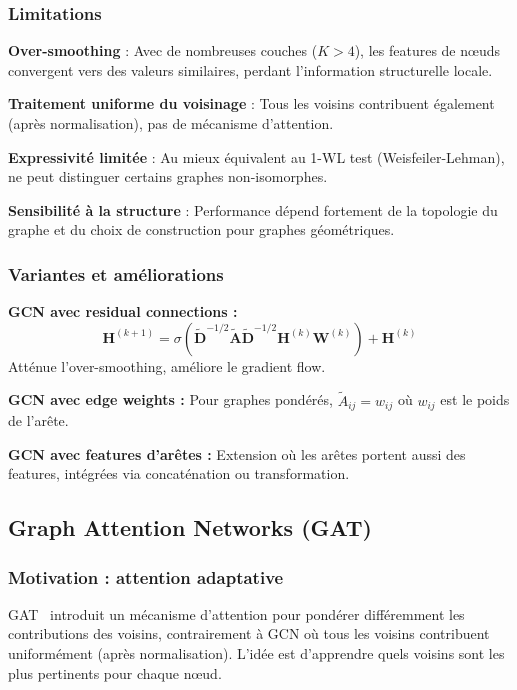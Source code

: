 \subsubsection{Limitations}

\textbf{Over-smoothing} : Avec de nombreuses couches ($K > 4$), les features de nœuds convergent vers des valeurs similaires, perdant l'information structurelle locale.
    
\textbf{Traitement uniforme du voisinage} : Tous les voisins contribuent également (après normalisation), pas de mécanisme d'attention.

\textbf{Expressivité limitée} : Au mieux équivalent au 1-WL test (Weisfeiler-Lehman), ne peut distinguer certains graphes non-isomorphes.

\textbf{Sensibilité à la structure} : Performance dépend fortement de la topologie du graphe et du choix de construction pour graphes géométriques.

\subsubsection{Variantes et améliorations}

\textbf{GCN avec residual connections :}
\[
\mathbf{H}^{(k+1)} = \sigma\left(\tilde{\mathbf{D}}^{-1/2}\tilde{\mathbf{A}}\tilde{\mathbf{D}}^{-1/2}\mathbf{H}^{(k)}\mathbf{W}^{(k)}\right) + \mathbf{H}^{(k)}
\]
Atténue l'over-smoothing, améliore le gradient flow.

\textbf{GCN avec edge weights :}
Pour graphes pondérés, $\tilde{A}_{ij} = w_{ij}$ où $w_{ij}$ est le poids de l'arête.

\textbf{GCN avec features d'arêtes :}
Extension où les arêtes portent aussi des features, intégrées via concaténation ou transformation.

\subsection{Graph Attention Networks (GAT)}

\subsubsection{Motivation : attention adaptative}

GAT~\cite{Velickovic2018} introduit un mécanisme d'attention pour pondérer différemment les contributions des voisins, contrairement à GCN où tous les voisins contribuent uniformément (après normalisation). L'idée est d'apprendre quels voisins sont les plus pertinents pour chaque nœud.

